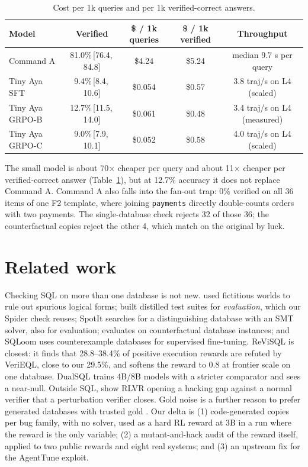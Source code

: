 \documentclass{article}
\newcommand{\code}[1]{\texttt{#1}}
\newcommand{\ci}[2]{\,[#1,\,#2]}
\begin{document}
\begin{table}[t]
\caption{Cost per 1k queries and per 1k verified-correct answers.}
\label{tab:roi}
\centering\small
\begin{tabular}{lcccc}
\toprule
Model & Verified & \$ / 1k queries & \$ / 1k verified & Throughput\\
\midrule
Command A & 81.0\%\ci{76.4}{84.8} & \$4.24 & \$5.24 & median 9.7 s per query\\
Tiny Aya SFT & 9.4\%\ci{8.4}{10.6} & \$0.054 & \$0.57 & 3.8 traj/s on L4 (scaled)\\
Tiny Aya GRPO-B & 12.7\%\ci{11.5}{14.0} & \$0.061 & \$0.48 & 3.4 traj/s on L4 (measured)\\
Tiny Aya GRPO-C & 9.0\%\ci{7.9}{10.1} & \$0.052 & \$0.58 & 4.0 traj/s on L4 (scaled)\\
\bottomrule
\end{tabular}
\end{table}

The small model is about 70$\times$ cheaper per query and about 11$\times$ cheaper per verified-correct answer (Table~\ref{tab:roi}), but at 12.7\% accuracy it does not replace Command A. Command A also falls into the fan-out trap: 0\% verified on all 36 items of one F2 template, where joining \code{payments} directly double-counts orders with two payments. The single-database check rejects 32 of those 36; the counterfactual copies reject the other 4, which match on the original by luck.

\section{Related work}
\label{sec:related}

Checking SQL on more than one database is not new. \citet{pasupat2016inferring} used fictitious worlds to rule out spurious logical forms; \citet{zhong2020semantic} built distilled test suites for \emph{evaluation}, which our Spider check reuses; SpotIt \citep{klopfenstein2025spotit} searches for a distinguishing database with an SMT solver, also for evaluation; \citet{ai2026counterfactual} evaluates on counterfactual database instances; and SQLoom \citep{sqloom2026} uses counterexample databases for supervised fine-tuning. ReViSQL \citep{revisql2026} is closest: it finds that 28.8--38.4\% of positive execution rewards are refuted by VeriEQL, close to our 29.5\%, and softens the reward to 0.8 at frontier scale on one database. DualSQL \citep{dualsql2026} trains 4B/8B models with a stricter comparator and sees a near-null. Outside SQL, \citet{helff2026gaming} show RLVR opening a hacking gap against a normal verifier that a perturbation verifier closes. Gold noise is a further reason to prefer generated databases with trusted gold \citep{jin2026annotation}. Our delta is (1) code-generated copies per bug family, with no solver, used as a hard RL reward at 3B in a run where the reward is the only variable; (2) a mutant-and-hack audit of the reward itself, applied to two public rewards and eight real systems; and (3) an upstream fix for the AgentTune exploit.
\end{document}
